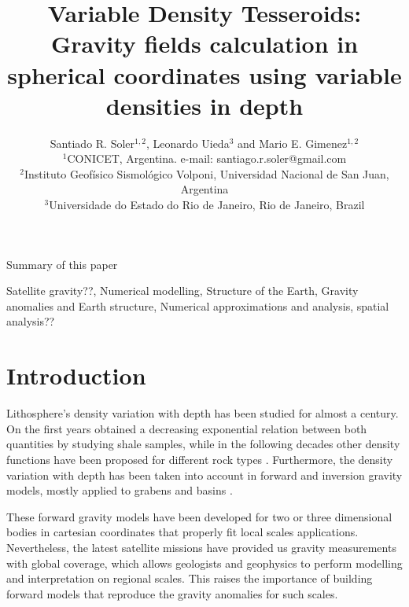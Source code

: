 \documentclass[extra]{gji}
\begin{document}
\title[Variable Density Tesseroids]{
    Variable Density Tesseroids: Gravity fields calculation in spherical coordinates using variable densities in depth
}
\author[S.R. Soler, L. Uieda and M.E. Gimenez]{
    Santiado R. Soler$^{1,2}$, Leonardo Uieda$^3$ and Mario E. Gimenez$^{1,2}$ \\
    $^1$CONICET, Argentina. e-mail: santiago.r.soler@gmail.com\\
    $^2$Instituto Geofísico Sismológico Volponi, Universidad Nacional de San Juan, Argentina\\
    $^3$Universidade do Estado do Rio de Janeiro, Rio de Janeiro, Brazil
    }


\maketitle

\begin{summary}
Summary of this paper 
\end{summary}

\begin{keywords}
Satellite gravity??, Numerical modelling, Structure of the Earth, Gravity anomalies and Earth structure, Numerical approximations and analysis, spatial analysis??
\end{keywords}


\section{Introduction}

Lithosphere's density variation with depth has been studied for almost a century. 
On the first years \citet{Athy1930} obtained a decreasing exponential relation between both quantities by studying shale samples, while in the following decades other density functions have been proposed for different rock types \citep[e.g.,][]{Maxant1980, Rao1986, Rao1993, Rao1994}.
Furthermore, the density variation with depth has been taken into account in forward and inversion gravity models, mostly applied to grabens and basins \citep{Cordell1973, Rao1986, Cowie1990, Rao1993, Rao1994, Zhang2001, Welford2010}.

These forward gravity models have been developed for two or three dimensional bodies in cartesian coordinates that properly fit local scales applications.
Nevertheless, the latest satellite missions have provided us gravity measurements with global coverage, which allows geologists and geophysics to perform modelling and interpretation on regional scales.
This raises the importance of building forward models that reproduce the gravity anomalies for such scales.
\end{document}

